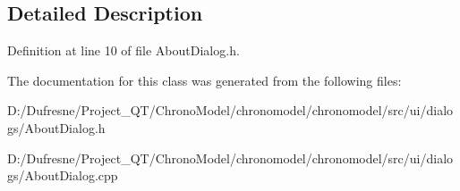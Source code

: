 \subsection{Detailed Description}


Definition at line 10 of file About\-Dialog.\-h.



The documentation for this class was generated from the following files\-:\begin{DoxyCompactItemize}
\item 
D\-:/\-Dufresne/\-Project\-\_\-\-Q\-T/\-Chrono\-Model/chronomodel/chronomodel/src/ui/dialogs/About\-Dialog.\-h\item 
D\-:/\-Dufresne/\-Project\-\_\-\-Q\-T/\-Chrono\-Model/chronomodel/chronomodel/src/ui/dialogs/About\-Dialog.\-cpp\end{DoxyCompactItemize}
